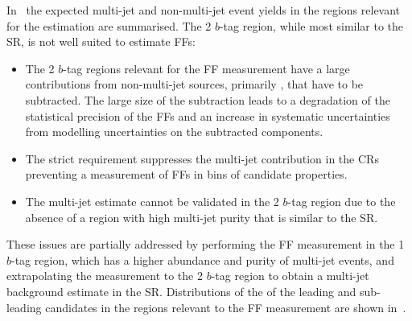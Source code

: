 In~ the expected multi-jet and non-multi-jet event
yields in the regions relevant for the \faketauhadvis estimation are
summarised. The 2 $b$-tag region, while most similar to the SR, is not well
suited to estimate FFs:
\begin{itemize}

\item The 2 $b$-tag regions relevant for the FF measurement have a large
  contributions from non-multi-jet sources, primarily \ttbarFakes, that have to
  be subtracted. The large size of the subtraction leads to a degradation of the
  statistical precision of the FFs and an increase in systematic uncertainties
  from modelling uncertainties on the subtracted components.

\item The strict \btag requirement suppresses the multi-jet contribution in the
  CRs preventing a measurement of FFs in bins of \tauhadvis candidate
  properties.

\item The multi-jet estimate cannot be validated in the 2 $b$-tag region due to
  the absence of a region with high multi-jet purity that is similar to the SR.

\end{itemize}
These issues are partially addressed by performing the FF measurement in the 1
$b$-tag region, which has a higher abundance and purity of multi-jet events, and
extrapolating the measurement to the 2 $b$-tag region to obtain a multi-jet
background estimate in the SR. Distributions of the \pT of the leading and
sub-leading \tauhadvis candidates in the regions relevant to the FF measurement
are shown in~.

